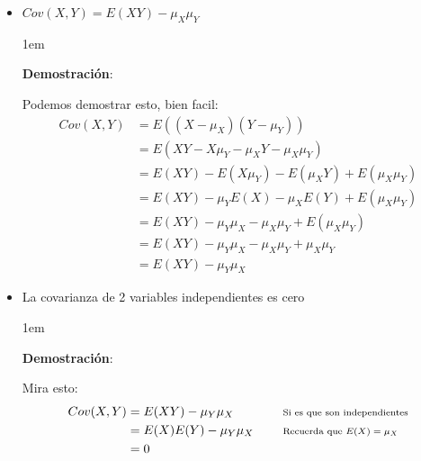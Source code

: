 \documentclass[12pt, fleqn]{report}                             %
\newenvironment{SmallIndentation}[1][0.75em]                    %
        {\begin{adjustwidth}{#1}{}\begin{footnotesize}}             %
        {\end{footnotesize}\end{adjustwidth}}                       %
\DeclareMathOperator \Space     {\quad}                         %
\newcommand \Remember[1]    {\Space\text{\scriptsize{#1}}}      %
\theoremstyle{break}                                            %
\newcommand{\Wrap}[1]           {\left( #1 \right)}             %
\begin{document}
                \begin{itemize}

                    \item 
                        $Cov(X, Y) = E(X Y) - \mu_{X}\mu_{Y}$

                        \begin{SmallIndentation}[1em]
                            \textbf{Demostración}:
                            
                            Podemos demostrar esto, bien facil:
                            \begin{align*}
                                Cov(X, Y)
                                    &= E\Wrap{(X - \mu_X)(Y - \mu_Y)}                   \\
                                    &= E\Wrap{XY - X\mu_Y -\mu_XY - \mu_X\mu_Y}         \\
                                    &= E(XY) - E(X\mu_Y) -E(\mu_XY) + E(\mu_X\mu_Y)     \\
                                    &= E(XY) - \mu_YE(X) -\mu_XE(Y) +  E(\mu_X\mu_Y)    \\
                                    &= E(XY) - \mu_Y\mu_X -\mu_X\mu_Y + E(\mu_X\mu_Y)   \\
                                    &= E(XY) - \mu_Y\mu_X -\mu_X\mu_Y + \mu_X\mu_Y      \\
                                    &= E(XY) - \mu_Y\mu_X
                            \end{align*}
                        
                        \end{SmallIndentation}

                    \item La covarianza de 2 variables independientes es cero

                    \begin{SmallIndentation}[1em]
                        \textbf{Demostración}:
                        
                        Mira esto:
                        \begin{align*}
                            Cov(X, Y)
                                &= E(XY) - \mu_Y\mu_X                           
                                    && \Remember{Si es que son independientes}      \\
                                &= E(X)E(Y) - \mu_Y\mu_X
                                    && \Remember{Recuerda que $E(X) = \mu_X$}       \\
                                &= 0
                        \end{align*}
                    
                    \end{SmallIndentation}
                        
                            
                \end{itemize}
\end{document}
